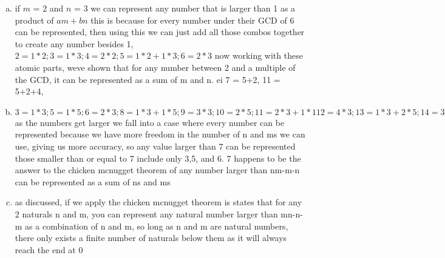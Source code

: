 \documentclass[12pt]{article}
\begin{document}
\begin{enumerate}[(a)]

    \item  if $m$ = 2 and $n$ = 3 we can represent any number that is larger than 1 as a product of $am+bn$ this is because for every number under their GCD of 6 can be represented, then using this we can just add all those combos together to create any number besides 1, $2 = 1*2; 3 = 1*3; 4 = 2*2; 5 = 1*2 + 1*3; 6 = 2*3 $ now working with these atomic parts, weve shown that for any number between 2 and a multiple of the GCD, it can be represented as a sum of m and n. ei 7 = 5+2, 11 = 5+2+4,

    \item $3 = 1*3; 5 = 1*5; 6 = 2*3; 8 = 1*3 + 1*5; 9 = 3*3; 10 = 2*5;11 = 2*3+1*1 12 = 4*3; 13 = 1*3 + 2*5; 14= 3*3+1*5;15 = 3*5$ 
as the numbers get larger we fall into a case where every number can be represented because we have more freedom in the number of n and ms we can use, giving us more accuracy, so any value larger than 7 can be represented
those smaller than or equal to 7 include only 3,5, and 6. 7 happens to be the answer to the chicken mcnugget theorem of any number larger than nm-m-n can be represented as a sum of ns and ms
    \item 
    as discussed, if we apply the chicken mcnugget theorem is states that for any 2 naturals n and m, you can represent any natural number larger than mn-n-m as a combination of n and m, so long as n and m are natural numbers, there only exists a finite number of naturals below them as it will always reach the end at 0
\end{enumerate}
\end{document}
